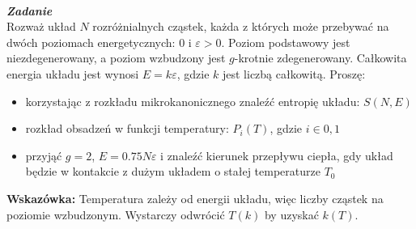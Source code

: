 \documentclass[11pt,a4paper]{article}
\newcounter{zadanie}\newcommand{\zadanie}[1][]{\addtocounter{zadanie}{1} ~\\  {\bf \emph{Zadanie \arabic{zadanie} #1 }} \\}
\begin{document}
\zadanie[]

Rozważ układ $N$ rozróżnialnych cząstek, każda z których może przebywać na dwóch poziomach 
energetycznych: $0$ i $\varepsilon > 0$. Poziom podstawowy jest niezdegenerowany, a poziom
wzbudzony jest $g$-krotnie zdegenerowany. Całkowita energia układu jest wynosi $E = k\varepsilon$,
gdzie $k$ jest liczbą całkowitą. Proszę:
\begin{itemize}
  \item korzystając z rozkładu mikrokanonicznego znaleźć entropię układu: $S(N,E)$
  \item rozkład obsadzeń w funkcji temperatury: $P_{i}(T)$, gdzie $i \in {0,1}$
  \item przyjąć $g=2$, $E = 0.75N\varepsilon$ i znaleźć kierunek przepływu ciepła, 
        gdy układ będzie w kontakcie z dużym układem o stałej temperaturze $T_0$
  \end{itemize}

{\bf Wskazówka:} Temperatura zależy od energii układu, więc liczby cząstek na poziomie wzbudzonym.
Wystarczy odwrócić $T(k)$ by uzyskać $k(T)$.
\end{document}
